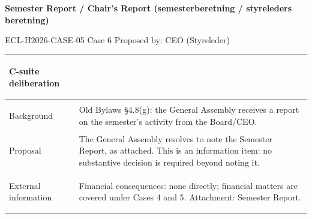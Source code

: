 \documentclass{../../../Common/Latex/Templates/rapport}
\begin{document}
\reportmainmatter
\small
\setlength{\parindent}{0pt}
\setlength{\tabcolsep}{6pt}
\renewcommand{\arraystretch}{1.2}

\begin{center}
  {\Large\bfseries Semester Report / Chair's Report (semesterberetning / styreleders beretning)}\par
  \vspace{0.15cm}
  {\normalsize ECL-H2026-CASE-05 \textperiodcentered{} Case 6 \textperiodcentered{} Proposed by: CEO (Styreleder)}\par
  \vspace{0.1cm}
  {\small \meetingline}\par
\end{center}

\vspace{0.3cm}
\begin{tabularx}{\textwidth}{|>{\bfseries\raggedright\arraybackslash}p{4.2cm}|X|}
  \hline
  C-suite deliberation & \rule{0pt}{4.1cm} \\
  \hline
  Background           & Old Bylaws \S4.8(g): the General Assembly receives a report on the semester's activity from the Board/CEO. \\
  \hline
  Proposal             & The General Assembly resolves to note the Semester Report, as attached. This is an information item: no substantive decision is required beyond noting it. \\
  \hline
  External information & Financial consequences: none directly; financial matters are covered under Cases 4 and 5. Attachment: Semester Report. \\
  \hline
\end{tabularx}
\end{document}
